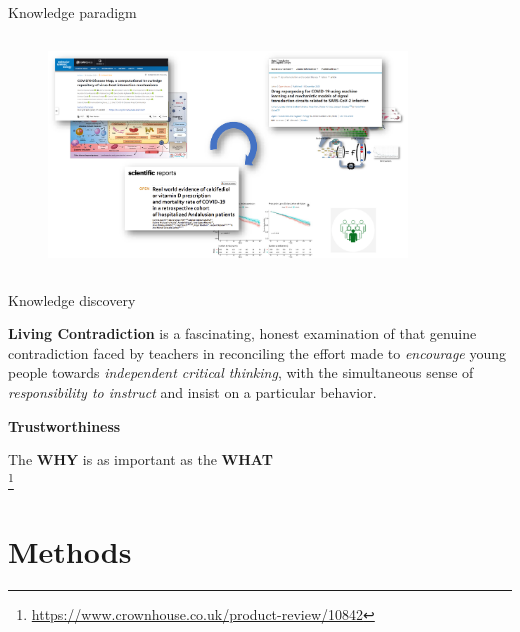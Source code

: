 \documentclass[compress,ignorenonframetext,aspectratio=1610]{beamer}
\newcommand\blfootnote[1]{%
  \begingroup
  \renewcommand\thefootnote{}\footnote{\tiny{#1}}%
  \addtocounter{footnote}{-1}%
  \endgroup
}
\begin{document}
\begin{frame}{Knowledge paradigm}
	\begin{columns}
		\begin{figure}
			\includegraphics[width=0.85\textwidth]{figs/methods/knowdge_paradigm-crop.pdf}
		\end{figure}

	\end{columns}
\end{frame}



\begin{frame}{Knowledge discovery}

	\textbf{Living Contradiction} is a fascinating, honest examination of that genuine contradiction faced 
	by teachers in reconciling the effort made to \emph{encourage} young people towards \emph{independent 
	critical thinking}, with the simultaneous sense of \emph{responsibility to instruct} and insist 
	on a particular behavior. \\

	\vspace*{1em}

	\textbf{Trustworthiness} \\

	\vspace*{1em}

	The \textbf{WHY} is as important as the \textbf{WHAT} \\

	\blfootnote{\url{https://www.crownhouse.co.uk/product-review/10842}}

\end{frame}

\section{Methods}
\end{document}
